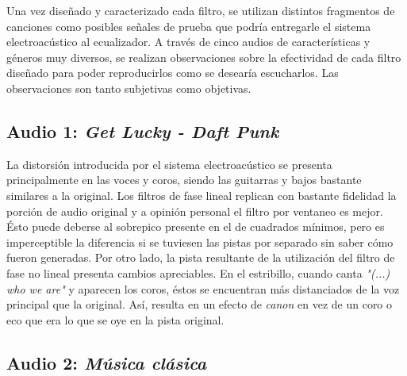 	Una vez diseñado y caracterizado cada filtro, se utilizan distintos fragmentos de canciones como posibles señales de prueba que podría entregarle el sistema electroacústico al ecualizador. A través de cinco audios de características y géneros muy diversos, se realizan observaciones sobre la efectividad de cada filtro diseñado para poder reproducirlos como se desearía escucharlos. Las observaciones son tanto subjetivas como objetivas.
	
	\subsection{Audio 1: \emph{Get Lucky - Daft Punk}}
	
	La distorsión introducida por el sistema electroacústico se presenta principalmente en las voces y coros, siendo las guitarras y bajos bastante similares a la original. Los filtros de fase lineal replican con bastante fidelidad la porción de audio original y a opinión personal el filtro por ventaneo es mejor. Ésto puede deberse al sobrepico presente en el de cuadrados mínimos, pero es imperceptible la diferencia si se tuviesen las pistas por separado sin saber cómo fueron generadas. Por otro lado, la pista resultante de la utilización del filtro de fase no lineal presenta cambios apreciables. En el estribillo, cuando canta \emph{"(...) who we are"} y aparecen los coros, éstos se encuentran más distanciados de la voz principal que la original. Así, resulta en un efecto de \emph{canon} en vez de un coro o eco que era lo que se oye en la pista original.
	
	
	\subsection{Audio 2: \emph{Música clásica}}
		
